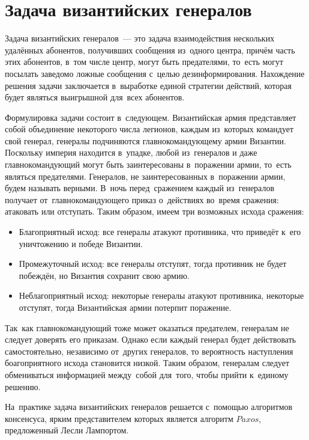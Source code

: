 \section{Задача византийских генералов}\label{sec:2}
Задача византийских генералов~--- это задача взаимодействия нескольких удалённых абонентов, получивших сообщения из~одного центра, причём часть этих абонентов, в~том числе центр, могут быть предателями, то~есть могут посылать заведомо ложные сообщения с~целью дезинформирования. Нахождение решения задачи заключается в~выработке единой стратегии действий, которая будет являться выигрышной для~всех абонентов.

Формулировка задачи состоит в~следующем. Византийская армия представляет собой объединение некоторого числа легионов, каждым из~которых командует свой генерал, генералы подчиняются главнокомандующему армии Византии. Поскольку империя находится в~упадке, любой из~генералов и даже главнокомандующий могут быть заинтересованы в~поражении армии, то~есть являться предателями. Генералов, не заинтересованных в~поражении армии, будем называть верными. В~ночь перед~сражением каждый из~генералов получает от~главнокомандующего приказ о~действиях во~время сражения: атаковать или отступать. Таким образом, имеем три возможных исхода сражения:
\begin{itemize}
	\item Благоприятный исход: все генералы атакуют противника, что приведёт к~его уничтожению и победе Византии.
	\item Промежуточный исход: все генералы отступят, тогда противник не будет побеждён, но Византия сохранит свою армию.
	\item Неблагоприятный исход: некоторые генералы атакуют противника, некоторые отступят, тогда Византийская армии потерпит поражение.
\end{itemize}

Так~как главнокомандующий тоже может оказаться предателем, генералам не следует доверять его приказам. Однако если каждый генерал будет действовать самостоятельно, независимо от~других генералов, то вероятность наступления боагоприятного исхода становится низкой. Таким образом, генералам следует обмениваться информацией между~собой для~того, чтобы прийти к~единому решению.

На~практике задача византийских генералов решается с~помощью алгоритмов консенсуса, ярким представителем которых является алгоритм $Paxos$, предложенный Лесли Лампортом.

